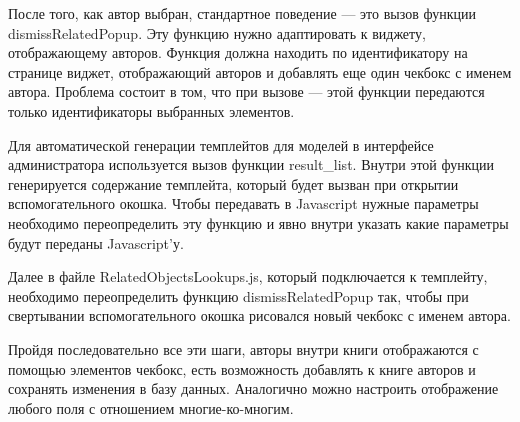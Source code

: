 После того, как автор выбран, стандартное поведение --- это вызов функции dismissRelatedPopup. Эту функцию нужно адаптировать к виджету, отображающему авторов. Функция должна находить по идентификатору на странице виджет, отображающий авторов и добавлять еще один чекбокс с именем автора. Проблема состоит в том, что при вызове --- этой функции передаются только идентификаторы выбранных элементов.

Для автоматической генерации темплейтов для моделей в интерфейсе администратора используется вызов функции result\_list. Внутри этой функции генерируется содержание темплейта, который будет вызван при открытии вспомогательного окошка. Чтобы передавать в Javascript нужные параметры необходимо переопределить эту функцию и явно внутри указать какие параметры будут переданы Javascript'у.

Далее в файле RelatedObjectsLookups.js, который подключается к темплейту, необходимо переопределить функцию dismissRelatedPopup так, чтобы при свертывании вспомогательного окошка рисовался новый чекбокс с именем автора. 

Пройдя последовательно все эти шаги, авторы внутри книги отображаются с помощью элементов чекбокс, есть возможность добавлять к книге авторов и сохранять изменения в базу данных. Аналогично можно настроить отображение любого поля с отношением многие-ко-многим.

\newpage
